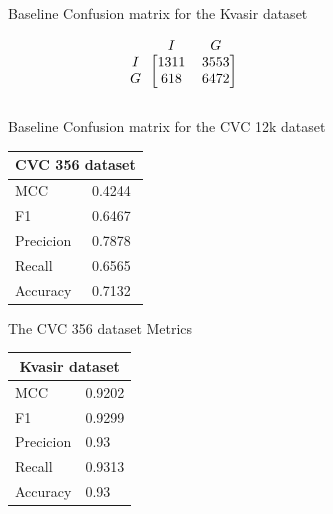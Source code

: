 \begin{figure}[h]
\begin{subfigure}[b]{0.49\textwidth}
        
\caption{Baseline Confusion matrix for the Kvasir dataset}
\label{mat:kvasir_CM_DN121_base}
\end{subfigure}
\begin{subfigure}[b]{0.25\textwidth}
        \[
\begin{blockarray}{ccc}
& I & G  \\
\begin{block}{c[cc]}
 		I&1311 & 3553\\
        G&618  & 6472\\
\end{block}
\end{blockarray}
\]   
\caption{Baseline Confusion matrix for the CVC 12k dataset}
\label{mat:cvc12k_CM_DN121_base}
\end{subfigure}
\caption{Confusion matrices for the three datasets}
\label{mat:CM_DN121_base}
\begin{subfigure}[b]{0.25\textwidth}
\begin{tabular}{ll}      
        \toprule
        \multicolumn{2}{c}{CVC 356 dataset}        \\
        \midrule
        MCC 		& 0.4244 \\
        F1  		& 0.6467 \\
        Precicion  	& 0.7878 \\
        Recall     	& 0.6565 \\
        Accuracy	& 0.7132 \\
        \bottomrule
        \end{tabular}
\caption{The CVC 356 dataset Metrics}
\label{tab:cvc356_metrics_DN121_base}
\end{subfigure}%
\begin{subfigure}[b]{0.49\textwidth}
    	\centering
        \begin{tabular}{ll}
        \toprule
        \multicolumn{2}{c}{Kvasir dataset}        \\
        \midrule
        MCC 		& 0.9202 \\
        F1  		& 0.9299 \\
        Precicion  	& 0.93 \\
        Recall     	& 0.9313  \\
        Accuracy	& 0.93 \\
        

\end{tabular}
\end{subfigure}
\end{figure}
